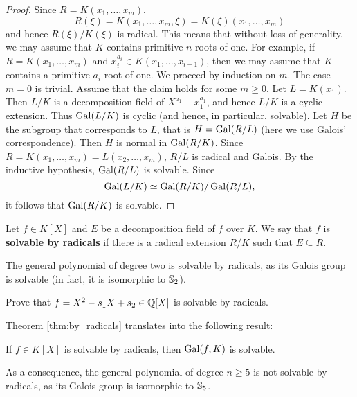 \begin{proof}
    Since
    $R=K(x_1,\dots,x_m)$,  
    \[
    R(\xi)=K(x_1,\dots,x_m,\xi)=K(\xi)(x_1,\dots,x_m)
    \]
    and hence $R(\xi)/K(\xi)$ is radical. 
    This means that
    without loss of generality, we may assume that
    $K$ contains primitive $n$-roots of one. For example, 
    if $R=K(x_1,\dots,x_m)$ and $x_i^{a_i}\in K(x_1,\dots,x_{i-1})$, 
    then we may assume that $K$ contains a primitive $a_i$-root of one. We proceed by induction on $m$. 
    The case $m=0$ is trivial. Assume that the claim holds for some $m\geq0$. Let 
    $L=K(x_1)$. Then $L/K$ is a decomposition field of $X^{a_1}-x_1^{a_1}$, and hence
    $L/K$ is a cyclic extension. Thus $\operatorname{Gal}(L/K)$ is cyclic (and hence, in particular, solvable). 
    Let $H$ be the subgroup that corresponds to $L$, that is
    $H=\operatorname{Gal}(R/L)$ (here we use Galois' correspondence). Then $H$ is normal in $\operatorname{Gal}(R/K)$. 
    Since $R=K(x_1,\dots,x_m)=L(x_2,\dots,x_m)$, $R/L$ is radical and Galois. By the inductive hypothesis, 
    $\operatorname{Gal}(R/L)$ is solvable. Since 
    \[
    \operatorname{Gal}(L/K)\simeq \operatorname{Gal}(R/K)/\operatorname{Gal}(R/L),
    \]
    it follows that $\operatorname{Gal}(R/K)$ is solvable. 
\end{proof}

\begin{definition}
    Let $f\in K[X]$ and $E$ be a decomposition field of $f$ over $K$. 
    We say that $f$ is \textbf{solvable by radicals} if
    there is a radical extension $R/K$ such that $E\subseteq R$. 
\end{definition}

The general polynomial of degree two 
is solvable by radicals, as its Galois group 
is solvable (in fact, it is isomorphic to $\mathbb{S}_2$).  

\begin{exercise}
    Prove that $f=X^2-s_1X+s_2\in\mathbb{Q}[X]$ is solvable by radicals. 
\end{exercise}

Theorem \ref{thm:by_radicals} translates into the following result:

\begin{exercise}
    If $f\in K[X]$ is solvable by radicals, then $\operatorname{Gal}(f,K)$ is solvable. 
\end{exercise}

As a consequence, the general polynomial of degree $n\geq5$ 
is not solvable by radicals, as its Galois group is isomorphic to 
$\mathbb{S}_5$. 


